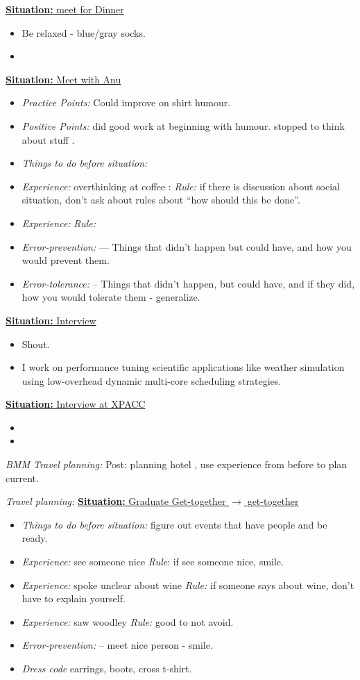 \documentclass[11pt]{article}
\newcommand{\newSituation}[1]{\underline{\textbf{Situation:} #1} }
\begin{document}
\newSituation {meet for Dinner}
\begin{itemize} 
\item Be relaxed - blue/gray socks. 
\item 
\end{itemize}

\newSituation{Meet with Anu}
\begin{itemize}
\item \textit{Practice Points:} Could improve on shirt humour. 
\item \textit{Positive Points:} did good work at beginning with
  humour. stopped to think about stuff . 
\item \textit{Things to do before situation:} 
\item \textit{Experience:} overthinking at coffee :   \textit{Rule:}
  if there is discussion about social situation, don't ask about rules
  about ``how should this be done''.  
\item \textit{Experience:}  \textit{Rule:} 
\item \textit{Error-prevention:}  ---  Things that didn't happen but
  could have, and how you would prevent them. 
\item \textit{Error-tolerance:} -- Things that didn't happen, but
  could have, and if they did, how you would tolerate them - generalize. 
\end{itemize}

\newSituation{Interview} 
\begin{itemize}
\item Shout. 
\item I work on performance tuning scientific applications like
  weather simulation using low-overhead dynamic multi-core scheduling
  strategies. 
\end{itemize} 

\newSituation{Interview at XPACC} 
\begin{itemize} 
\item 
\item 
\end{itemize}  
\item \tiny \textit{BMM Travel planning:} Post: planning hotel , use experience from before to plan current.   
\item \tiny \textit{Travel planning:} 
\newSituation{Graduate Get-together $\rightarrow$ get-together} 
\begin{itemize}
\item \textit{Things to do before situation:} figure out events that
  have people and be ready. 

\item  \textit{Experience:} see someone nice \textit{Rule}: if see
  someone nice, smile. 
\item \textit{Experience:} spoke unclear about wine \textit{Rule:} if
  someone says about wine, don't have to explain yourself. 
\item \textit{Experience:} saw woodley   \textit{Rule:} good to not
  avoid. 
\item \textit{Error-prevention:}  -- meet nice person - smile. 
\item \textit{Dress code} earrings, boots, cross t-shirt. 
\end{itemize} 
\end{document}
